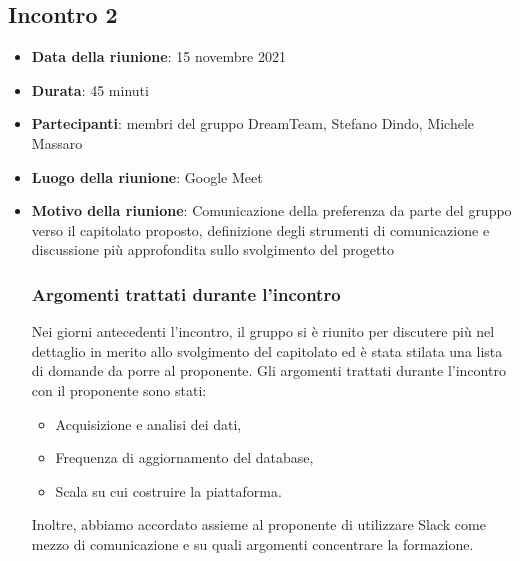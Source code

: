 \subsection{Incontro 2}
\begin{itemize}
\item \textbf{Data della riunione}: 15 novembre 2021
\item \textbf{Durata}: 45 minuti
\item \textbf{Partecipanti}: membri del gruppo DreamTeam,  Stefano Dindo,  Michele Massaro
\item \textbf{Luogo della riunione}: Google Meet
\item \textbf{Motivo della riunione}: Comunicazione della preferenza da parte del gruppo verso il capitolato proposto, definizione degli strumenti di comunicazione e discussione più approfondita sullo svolgimento del progetto
\subsubsection{Argomenti trattati durante l'incontro}
Nei giorni antecedenti l’incontro, il gruppo si è riunito per discutere più nel dettaglio in merito allo svolgimento del capitolato ed è stata stilata una lista di domande da porre al proponente.  Gli argomenti trattati durante l’incontro con il proponente sono stati:
	\begin{itemize}
		\item Acquisizione e analisi dei dati,
		\item Frequenza di aggiornamento del database,
		\item Scala su cui costruire la piattaforma.
	\end{itemize}
	Inoltre, abbiamo accordato assieme al proponente di utilizzare Slack come mezzo di comunicazione e su quali argomenti concentrare la formazione.

\end{itemize} 


